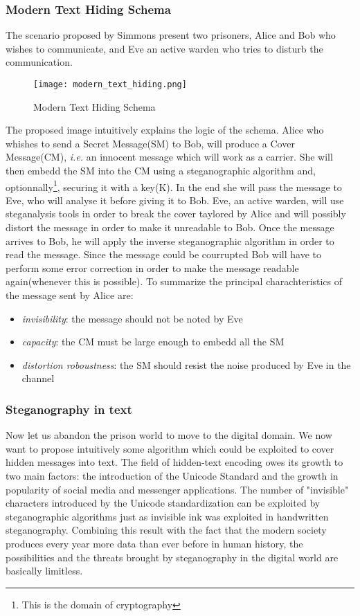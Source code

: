 \documentclass[../../main.tex]{subfiles}
\begin{document}
    \subsubsection{Modern Text Hiding Schema}
    The scenario proposed by Simmons present two prisoners, Alice and Bob who wishes to communicate, and Eve an active warden who tries to disturb the communication.
    
    \begin{figure}[h]
        \centering
        \caption{Modern Text Hiding Schema}
        \texttt{[image: modern\_text\_hiding.png]}
    \end{figure}
    
    The proposed image intuitively explains the logic of the schema. Alice who whishes to send a Secret Message(SM) to Bob, will produce a Cover Message(CM), 
    \emph{i.e.} an innocent message which will work as a carrier. She will then embedd the SM into the CM using a steganographic algorithm and, optionnally\footnote{This is the domain of cryptography}, securing it with a key(K).
    In the end she will pass the message to Eve, who will analyse it before giving it to Bob. Eve, an active warden, will use steganalysis tools in order to break the cover taylored by Alice and will possibly distort the message in order to make it unreadable to Bob.
    Once the message arrives to Bob, he will apply the inverse steganographic algorithm in order to read the message. Since the message could be courrupted Bob will have to perform some error correction in order to make the message readable again(whenever this is possible).
    To summarize the principal charachteristics of the message sent by Alice are:
    \begin{itemize}
        \item \emph{invisibility}: the message should not be noted by Eve
        \item \emph{capacity}: the CM must be large enough to embedd all the SM
        \item \emph{distortion roboustness}: the SM should resist the noise produced by Eve in the channel
    \end{itemize}

    \subsubsection{Steganography in text}
    Now let us abandon the prison world to move to the digital domain. We now want to propose intuitively some algorithm which could be exploited to cover hidden messages into text.
    The field of hidden-text encoding owes its growth to two main factors: the introduction of the Unicode Standard and the growth in popularity of social media and messenger applications.
    The number of "invisible" characters introduced by the Unicode standardization can be exploited by steganographic algorithms just as invisible ink was exploited in handwritten steganography.
    Combining this result with the fact that the modern society produces every year more data than ever before in human history, the possibilities and the threats brought by steganography in the digital world are basically limitless.
\end{document}
